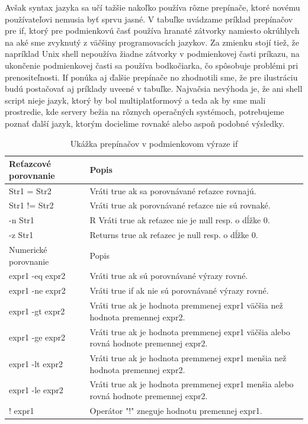 Avšak syntax jazyka sa učí tažšie nakoľko používa rôzne prepínače, ktoré novému používateľovi nemusia byť sprvu jasné. 
V tabuľke uvádzame príklad prepínačov pre if, ktorý pre podmienkovú časť používa hranaté zátvorky namiesto okrúhlych na aké sme zvyknutý z väčšiny programovacích jazykov. Za zmienku stojí tiež, že napríklad Unix shell nepoužíva žiadne zátvorky v podmienkovej časti príkazu, na ukončenie podmienkovej časti sa používa bodkočiarka, čo spôsobuje problémi pri prenositeľnosti. If ponúka aj ďalšie prepínače no zhodnotili sme, že pre ilustráciu budú postačovať aj príklady uveené v tabuľke.
Najvačsia nevýhoda je, že ani shell script nieje jazyk, ktorý by bol multiplatformový a teda ak by sme mali prostredie, kde servery bežia na rôznych operačných systémoch, potrebujeme poznať ďalší jazyk, ktorým docielime rovnaké alebo aspoň podobné výsledky.
\newline
\begin{table}[h!]
	\centering
	\begin{tabular}{|p{4cm}|p{13cm}|}
		\hline
		Reťazcové porovnanie & Popis \\
		\hline
		Str1 = Str2	& Vráti true ak sa porovnávané reťazce rovnajú. \\ 
		\hline
		Str1 != Str2 &	Vráti true ak porovnávané reťazce nie sú rovnaké.\\ 
		\hline
		-n Str1	 &R Vráti true ak reťazec nie je null resp. o dĺžke 0.\\ 
		\hline
		-z Str1	& Returns true ak reťazec je null resp. o dĺžke 0.\\
		\hline
		\hline
		Numerické porovnanie	& Popis \\
		\hline
		expr1 -eq expr2	& Vráti true ak sú porovnávané výrazy rovné. \\
		\hline
		expr1 -ne expr2	& Vráti true if ak nie sú porovnávané výrazy rovné. \\
		\hline
		expr1 -gt expr2	& Vráti true ak je hodnota premmenej expr1 väčšia než hodnota premennej expr2. \\
		\hline
		expr1 -ge expr2	& Vráti true ak je hodnota premmenej expr1 väčšia alebo rovná hodnote premennej expr2. \\
		\hline
		expr1 -lt expr2	& Vráti true ak je hodnota premmenej expr1 menšia než hodnota premennej  expr2. \\
		\hline
		expr1 -le expr2	& Vráti true ak je hodnota premmenej expr1 menšia alebo rovná hodnote premennej expr2. \\
		\hline
		! expr1	& Operátor "!" zneguje hodnotu premennej expr1. \\
		\hline
	\end{tabular}
	\caption{Ukážka prepínačov v podmienkovom výraze if \cite{shellprep}}
	\label{table:1}
	
\end{table}
\newpage

